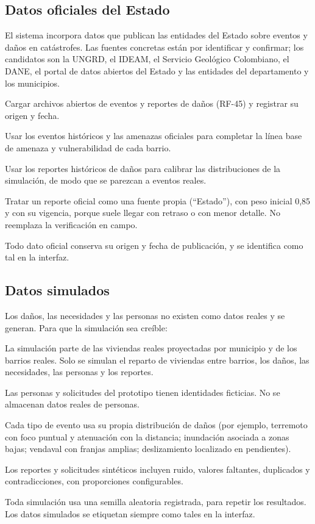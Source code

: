 \subsection{Datos oficiales del Estado}
El sistema incorpora datos que publican las entidades del Estado sobre eventos y daños en catástrofes. Las fuentes concretas están por identificar y confirmar; los candidatos son la UNGRD, el IDEAM, el Servicio Geológico Colombiano, el DANE, el portal de datos abiertos del Estado y las entidades del departamento y los municipios.
\begin{description}[leftmargin=0pt]
  \item[RD-04 (\Should).] Cargar archivos abiertos de eventos y reportes de daños (RF-45) y registrar su origen y fecha.
  \item[RD-05 (\Should).] Usar los eventos históricos y las amenazas oficiales para completar la línea base de amenaza y vulnerabilidad de cada barrio.
  \item[RD-06 (\Should).] Usar los reportes históricos de daños para calibrar las distribuciones de la simulación, de modo que se parezcan a eventos reales.
  \item[RD-07 (\Should).] Tratar un reporte oficial como una fuente propia (``Estado''), con peso inicial 0,85 y con su vigencia, porque suele llegar con retraso o con menor detalle. No reemplaza la verificación en campo.
  \item[RD-08 (\Must).] Todo dato oficial conserva su origen y fecha de publicación, y se identifica como tal en la interfaz.
\end{description}

\subsection{Datos simulados}
Los daños, las necesidades y las personas no existen como datos reales y se generan. Para que la simulación sea creíble:
\begin{description}[leftmargin=0pt]
  \item[RD-09 (\Must).] La simulación parte de las viviendas reales proyectadas por municipio y de los barrios reales. Solo se simulan el reparto de viviendas entre barrios, los daños, las necesidades, las personas y los reportes.
  \item[RD-10 (\Must).] Las personas y solicitudes del prototipo tienen identidades ficticias. No se almacenan datos reales de personas.
  \item[RD-11 (\Must).] Cada tipo de evento usa su propia distribución de daños (por ejemplo, terremoto con foco puntual y atenuación con la distancia; inundación asociada a zonas bajas; vendaval con franjas amplias; deslizamiento localizado en pendientes).
  \item[RD-12 (\Must).] Los reportes y solicitudes sintéticos incluyen ruido, valores faltantes, duplicados y contradicciones, con proporciones configurables.
  \item[RD-13 (\Must).] Toda simulación usa una semilla aleatoria registrada, para repetir los resultados. Los datos simulados se etiquetan siempre como tales en la interfaz.
\end{description}

